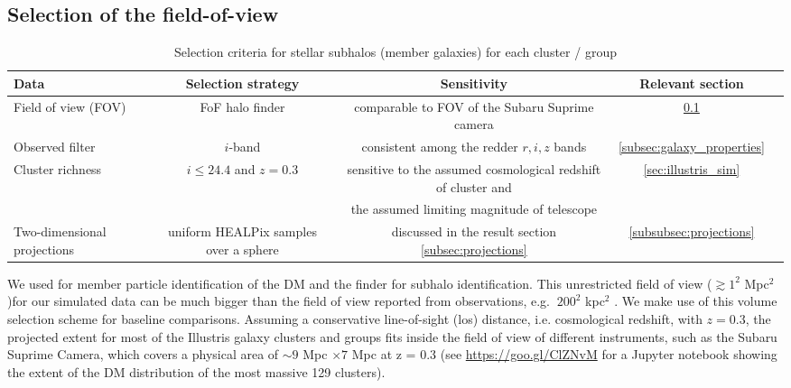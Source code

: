 \subsection{Selection of the field-of-view}
\label{sec:FOV}

\begin{table*}
\begin{center}
	\caption{ Selection criteria for stellar subhalos (member galaxies) for each
		cluster / group 
\label{tab:member_galaxy_selections}} 

	\begin{tabular}{@{}lcccc@{}}
\hline 
Data &  Selection strategy  & Sensitivity & Relevant section  \\ \hline
Field of view (FOV) & FoF halo finder& comparable to FOV of the Subaru
Suprime camera & \ref{sec:FOV}  \\ 
Observed filter & $i$-band & consistent among the redder $r, i, z$ bands &   
\ref{subsec:galaxy_properties}
\\ 
Cluster richness  & $i \leq 24.4$ and $z = 0.3$  & sensitive to
the assumed cosmological redshift of cluster and & \ref{sec:illustris_sim} \\ 
& & the assumed limiting magnitude of telescope &   \\
Two-dimensional projections & uniform HEALPix samples over a sphere &
discussed in the result section \ref{subsec:projections} & \ref{subsubsec:projections}\\  
\hline
\end{tabular} 

\end{center} 
\end{table*}

We used {} for member particle identification of the DM and the 
{} finder for subhalo identification.
This unrestricted field of view ($\gtrsim 1^2$ Mpc$^2$)for our simulated data can be much bigger than
the field of view reported from
observations, e.g. $~200^2$ kpc$^2$ \citep{Zitrin2012a}. We make use of this volume selection scheme
for baseline comparisons. Assuming a conservative line-of-sight (los) distance, 
i.e. cosmological redshift, with  $z = 0.3$, 
the projected extent for most of the Illustris galaxy clusters and groups
fits inside the field of view of different instruments, such as the Subaru Suprime Camera,
which covers a physical area of $\sim 9$ Mpc $\times 7$ Mpc at z = 0.3 
(see \href{https://goo.gl/ClZNvM}{https://goo.gl/ClZNvM} for a Jupyter notebook 
showing the extent of the DM distribution of the most massive 129
clusters).

